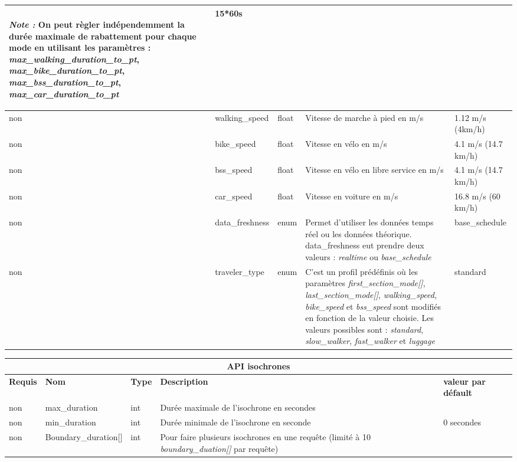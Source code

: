 \documentclass[a4paper]{report}
\begin{document}
\begin{center}
\begin{tabular}{|l|l|p{1.5cm}|p{6cm}|l|}
	\paragraph{}\emph{Note :} On peut règler indépendemment la durée maximale de rabattement pour chaque mode en utilisant les paramètres : \emph{max\_walking\_duration\_to\_pt}, \emph{max\_bike\_duration\_to\_pt}, \emph{max\_bss\_duration\_to\_pt}, \emph{max\_car\_duration\_to\_pt} & 15*60s \\
	\hline
	non & walking\_speed & float & Vitesse de marche à pied en m/s & 1.12 m/s (4km/h) \\
	\hline
	non & bike\_speed & float & Vitesse en vélo en m/s & 4.1 m/s (14.7 km/h) \\
	\hline
	non & bss\_speed & float & Vitesse en vélo en libre service en m/s & 4.1 m/s (14.7 km/h) \\
	\hline
	non & car\_speed & float & Vitesse en voiture en m/s & 16.8 m/s (60 km/h) \\
	\hline
	non & data\_freshness & enum & Permet d'utiliser les données temps réel ou les données théorique. data\_freshness eut prendre deux valeurs : \emph{realtime} ou \emph{base\_schedule} & base\_schedule \\
	\hline
	non & traveler\_type & enum & C'est un profil prédéfinis où les paramètres \emph{first\_section\_mode[]}, \emph{last\_section\_mode[]}, \emph{walking\_speed}, \emph{bike\_speed} et \emph{bss\_speed} sont modifiés en fonction de la valeur choisie. Les valeurs possibles sont : \emph{standard}, \emph{slow\_walker}, \emph{fast\_walker} et \emph{luggage} & standard \\
	\hline
	\end{tabular}
\end{center}

\begin{center}
	\begin{tabular}{|l|l|p{1.5cm}|p{6cm}|l|}
	\hline
	\multicolumn{5}{|c|}{\cellcolor{LightCyan} \textbf{API isochrones}} \\
	\hline
	\textbf{Requis} & \textbf{Nom} & \textbf{Type} & \textbf{Description} &  \textbf{valeur par défault} \\
	\hline
	non & max\_duration & int & Durée maximale de l'isochrone en secondes &\\
	\hline
	non & min\_duration & int & Durée minimale de l'isochrone en seconde & 0 secondes\\
	\hline
	non & Boundary\_duration[] & int & Pour faire plusieurs isochrones en une requête (limité à 10 \emph{boundary\_duation[]} par requête) & \\
	\hline
	\end{tabular}
\end{center}
\end{document}

